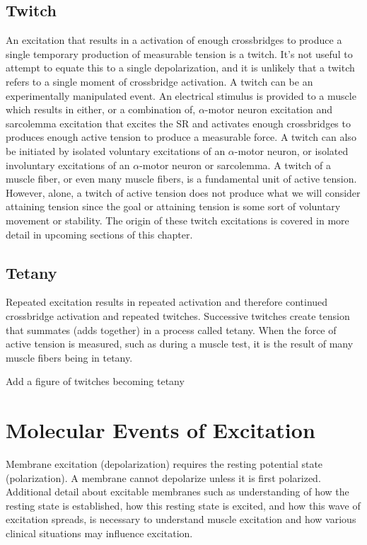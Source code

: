 \subsection{Twitch}
An excitation that results in a activation of enough crossbridges to produce a single temporary production of measurable tension is a twitch. It’s not useful to attempt to equate this to a single depolarization, and it is unlikely that a twitch refers to a single moment of crossbridge activation. A twitch can be an experimentally manipulated event. An electrical stimulus is provided to a muscle which results in either, or a combination of, $\alpha$-motor neuron excitation and sarcolemma excitation that excites the SR and activates enough crossbridges to produces enough active tension to produce a measurable force. A twitch can also be initiated by isolated voluntary excitations of an $\alpha$-motor neuron, or isolated involuntary excitations of an $\alpha$-motor neuron or sarcolemma. A twitch of a muscle fiber, or even many muscle fibers, is a fundamental unit of active tension. However, alone, a twitch of active tension does not produce what we will consider attaining tension since the goal or attaining tension is some sort of voluntary movement or stability. The origin of these twitch excitations is covered in more detail in upcoming sections of this chapter.



\subsection{Tetany}
Repeated excitation results in repeated activation and therefore continued crossbridge activation and repeated twitches. Successive twitches create tension that summates (adds together) in a process called tetany. When the force of active tension is measured, such as during a muscle test, it is the result of many muscle fibers being in tetany.  

Add a figure of twitches becoming tetany

\section{Molecular Events of Excitation}

Membrane excitation (depolarization) requires the resting potential state (polarization). A membrane cannot depolarize unless it is first polarized. Additional detail about excitable membranes such as understanding of how the resting state is established, how this resting state is excited, and how this wave of excitation spreads, is necessary to understand muscle excitation and how various clinical situations may influence excitation.

